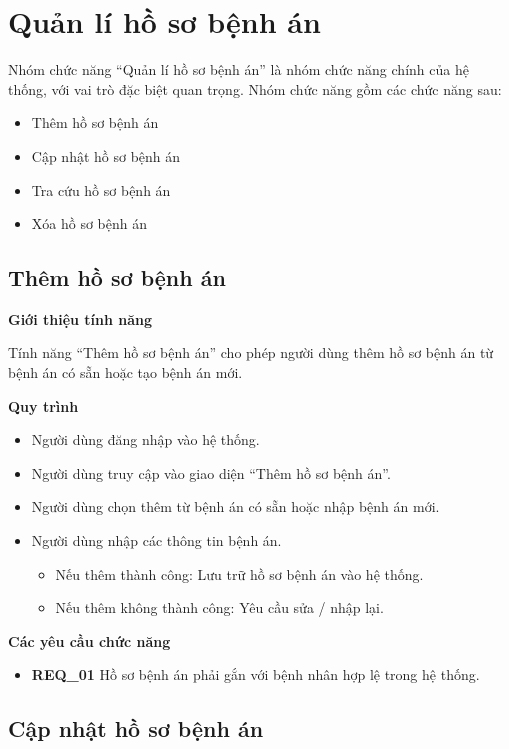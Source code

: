 \section{Quản lí hồ sơ bệnh án}

Nhóm chức năng ``Quản lí hồ sơ bệnh án'' là nhóm chức năng chính của hệ thống, với vai trò đặc biệt quan trọng. Nhóm chức năng gồm các chức năng sau:
\begin{itemize}
    \item Thêm hồ sơ bệnh án
    \item Cập nhật hồ sơ bệnh án
    \item Tra cứu hồ sơ bệnh án
    \item Xóa hồ sơ bệnh án
\end{itemize}

\subsection{Thêm hồ sơ bệnh án}

\noindent \textbf{Giới thiệu tính năng}

Tính năng ``Thêm hồ sơ bệnh án'' cho phép người dùng thêm hồ sơ bệnh án từ bệnh án có sẵn hoặc tạo bệnh án mới.

\noindent \textbf{Quy trình}
\begin{itemize}
    \item Người dùng đăng nhập vào hệ thống.
    \item Người dùng truy cập vào giao diện ``Thêm hồ sơ bệnh án''.
    \item Người dùng chọn thêm từ bệnh án có sẵn hoặc nhập bệnh án mới.
    \item Người dùng nhập các thông tin bệnh án.
    \begin{itemize}
        \item Nếu thêm thành công: Lưu trữ hồ sơ bệnh án vào hệ thống.
        \item Nếu thêm không thành công: Yêu cầu sửa / nhập lại.
    \end{itemize}
\end{itemize}

\noindent \textbf{Các yêu cầu chức năng}
\begin{itemize}
    \item \textbf{REQ\_01} Hồ sơ bệnh án phải gắn với bệnh nhân hợp lệ trong hệ thống.
\end{itemize}

\subsection{Cập nhật hồ sơ bệnh án}

